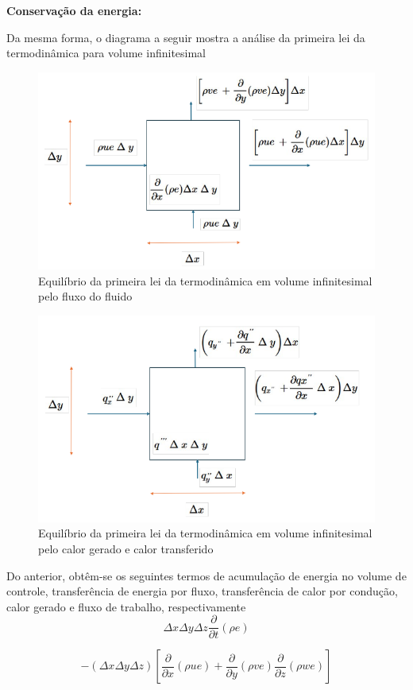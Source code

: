 \documentclass[]{article}
\begin{document}
\textbf{Conservação da energia:} 

Da mesma forma, o diagrama a seguir mostra a análise da primeira lei da termodinâmica para volume infinitesimal

\begin{figure}[H]
	\centering
	\includegraphics[width=.65\textwidth]{figures/1_4}
	\caption{Equilíbrio da primeira lei da termodinâmica em volume infinitesimal pelo fluxo do fluido}
\end{figure}

\begin{figure}[H]
	\centering
	\includegraphics[width=.65\textwidth]{figures/1_5}
	\caption{Equilíbrio da primeira lei da termodinâmica em volume infinitesimal pelo calor gerado e calor transferido}
\end{figure}

Do anterior, obtêm-se os seguintes termos de acumulação de energia no volume de controle, transferência de energia por fluxo, transferência de calor por condução, calor gerado e fluxo de trabalho, respectivamente
\begin{equation}
	 \Delta x \Delta y  \Delta z \frac{\partial}{\partial t} (\rho e)
\end{equation}

\begin{equation}
	 - (\Delta x \Delta y \Delta z) 
	\left[ \frac{\partial}{\partial x} (\rho u e) + \frac{\partial}{\partial y} (\rho v e) \frac{\partial}{\partial z} (\rho w e)\right]
\end{equation}
\end{document}
